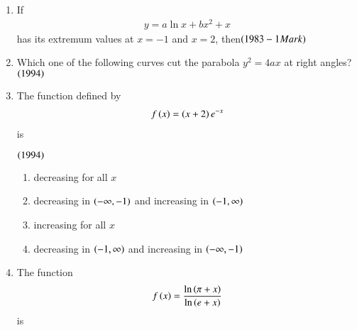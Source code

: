 \documentclass[journal,12pt,twocolumn]{IEEEtran}
\theoremstyle{remark}
\begin{document}
\begin{enumerate}
	\item If \begin{align*}y=a\ln x + bx^2 +x\end{align*} has its extremum values at 
$x = -1$ and $x = 2$, then\hfill$\left(1983 - 1 Mark\right)$

\begin{enumerate}
\end{enumerate}

        \item Which one of the following curves cut the parabola
$y^2 = 4ax$ at right angles?\hfill$\left(1994\right)$

\begin{enumerate}
\end{enumerate}

	\item The function defined by 
\begin{align*}f\left(x\right) = \left(x+2\right)e^{-x}\end{align*} is

		\hfill$\left(1994\right)$

\begin{enumerate}
	\item decreasing for all $x$
	\item decreasing in $\left(-\infty, -1\right)$ and increasing
		in $\left(-1, \infty\right)$
        \item increasing for all $x$
	\item decreasing in $\left(-1, \infty\right)$ and increasing
		in $\left(-\infty, -1\right)$\\
\end{enumerate}

	\item The function \begin{align*}f\left(x\right) =
	\frac{\ln \left(\pi + x\right)}{\ln \left(e + x\right)}\end{align*} is


\end{enumerate}
\end{document}
